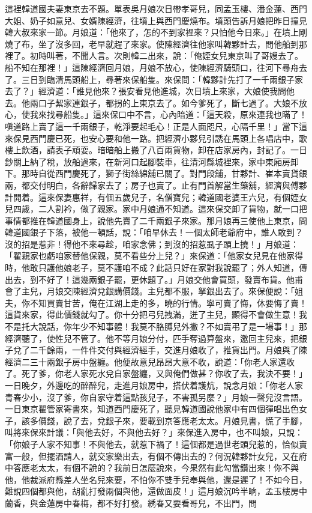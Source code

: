 這裡韓道國夫妻東京去不題。單表吳月娘次日帶孝哥兒，同孟玉樓、潘金蓮、西門大姐、奶子如意兒、女婿陳經濟，往墳上與西門慶燒布。墳頭告訴月娘把昨日撞見韓大叔來家一節。月娘道：「他來了，怎的不到家裡來？只怕他今日來。」在墳上剛燒了布，坐了沒多回，老早就趕了來家。使陳經濟往他家叫韓夥計去，問他船到那裡了。初時叫著，不聞人言。次則韓二出來，說：「俺姪女兒東京叫了哥嫂去了。船不知在那裡！」這陳經濟回月娘，月娘不放心，使陳經濟騎頭口，往河下尋舟去了。三日到臨清馬頭船上，尋著來保船隻。來保問：「韓夥計先打了一千兩銀子家去了？」經濟道：「誰見他來？張安看見他進城，次日墳上來家，大娘使我問他去。他兩口子絜家連銀子，都拐的上東京去了。如今爹死了，斷七過了。大娘不放心，使我來找尋船隻。」這來保口中不言，心內暗道：「這天殺，原來連我也瞞了！嗔道路上賣了這一千兩銀子，乾淨要起毛心！正是人面咫尺，心隔千里！」當下這來保見西門慶已死，也安心要和他一路。把經濟小夥兒引誘在馬頭上各唱店中，歌樓上飲酒，請表子頑耍。暗暗船上搬了八百兩貨物，卸在店家房內，封記了。一日鈔關上納了稅，放船過來，在新河口起腳裝車，往清河縣城裡來，家中東廂房卸下。那時自從西門慶死了，獅子街絲綿舖已關了。對門段舖，甘夥計、崔本賣貨銀兩，都交付明白，各辭歸家去了；房子也賣了。止有門首解當生藥舖，經濟與傅夥計開着。這來保妻惠祥，有個五歲兒子，名僧寶兒；韓道國老婆王六兒，有個姪女兒四歲，二人割衿，做了親家。家中月娘通不知道。這來保交卸了貨物，就一口把事情都推在韓道國身上，說他先賣了二千兩銀子來家。那月娘再三使他上東京，問韓道國銀子下落，被他一頓話，說：「咱早休去！一個太師老爺府中，誰人敢到？沒的招是惹非！得他不來尋趁，咱家念佛；到沒的招惹虱子頭上撓！」月娘道：「翟親家也虧咱家替他保親，莫不看些分上兒？」來保道：「他家女兒見在他家得時，他敢只護他娘老子，莫不護咱不成？此話只好在家對我說罷了；外人知道，傳出去，到不好了！這幾兩銀子罷，更休題了。」月娘交他會買頭，發賣布貨。他甫會了主兒，月娘交陳經濟兌銀講價錢。主兒都不服，拏銀出去了。來保便說：「姐夫，你不知買賣甘苦，俺在江湖上走的多，曉的行情。寧可賣了悔，休要悔了賣！這貨來家，得此價錢就勾了。你十分把弓兒拽滿，迸了主兒，顯得不會做生意！我不是托大說話，你年少不知事體！我莫不胳膊兒外撇？不如賣弔了是一場事！」那經濟聽了，使性兒不管了。他不等月娘分付，匹手奪過算盤來，邀回主兒來，把銀子兌了二千餘兩，一件件交付與經濟經手，交進月娘收了，推貨出門。月娘與了陳經濟二三十兩銀子房中盤纏。他便故意兒昂昂大意不收，說道：「你老人家還收了。死了爹，你老人家死水兌自家盤纏，又與俺們做甚？你收了去，我決不要！」一日晚夕，外邊吃的醉醉兒，走進月娘房中，搭伏着護炕，說念月娘：「你老人家青春少小，沒了爹，你自家守着這點孩兒子，不害孤另麼？」月娘一聲兒沒言語。一日東京翟管家寄書來，知道西門慶死了，聽見韓道國說他家中有四個彈唱出色女子，該多價錢，說了去，兌銀子來，要載到京答應老太太。月娘見書，慌了手腳，叫將來保來計議：「與他去好，不與他去好？」來保進入房中，也不叫娘，只說：「你娘子人家不知事！不與他去，就惹下禍了！這個都是過世老頭兒惹的，恰似賣富一般，但擺酒請人，就交家樂出去，有個不傳出去的？何況韓夥計女兒，又在府中答應老太太，有個不說的？我前日怎麼說來，今果然有此勾當鑽出來！你不與他，他裁派府縣差人坐名兒來要，不怕你不雙手兒奉與他，還是遲了！不如今日，難說四個都與他，胡亂打發兩個與他，還做面皮！」這月娘沉吟半晌，孟玉樓房中蘭香，與金蓮房中春梅，都不好打發。綉春又要看哥兒，不出門，問